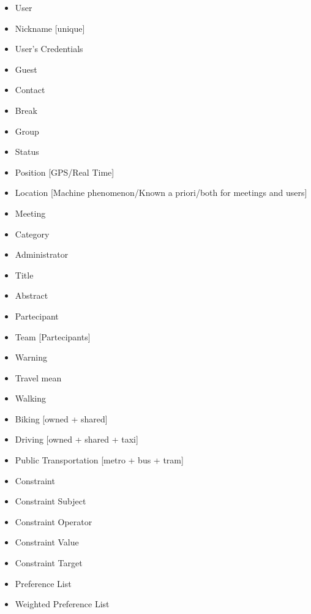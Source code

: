 \begin{itemize}
\item User
\item Nickname [unique]
\item User’s Credentials
\item Guest
\item Contact
\item Break
\item Group
\item Status

\item Position [GPS/Real Time]
\item Location [Machine phenomenon/Known a priori/both for meetings and users]

\item Meeting
\item Category
\item Administrator
\item Title
\item Abstract
\item Partecipant
\item Team [Partecipants]

\item Warning

\item Travel mean
\item Walking
\item Biking [owned + shared]
\item Driving [owned + shared + taxi]
\item Public Transportation [metro + bus + tram]

\item Constraint
\item Constraint Subject
\item Constraint Operator
\item Constraint Value
\item Constraint Target

\item Preference List
\item Weighted Preference List
\end{itemize}